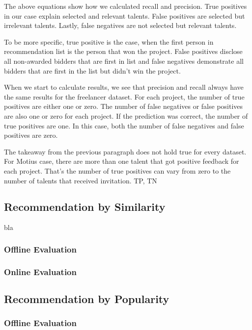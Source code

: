 The above equations show how we calculated recall and precision. True positives in our case explain selected and relevant talents. False positives are selected but irrelevant talents. Lastly, false negatives are not selected but relevant talents.

To be more specific, true positive is the case, when the first person in recommendation list is the person that won the project. False positives disclose all non-awarded bidders that are first in list and false negatives demonstrate all bidders that are first in the list but didn't win the project. 

When we start to calculate results, we see that precision and recall always have the same results for the freelancer dataset. For each project, the number of true positives are either one or zero. The number of false negatives or false positives are also one or zero for each project. If the prediction was correct, the number of true positives are one. In this case, both the number of false negatives and false positives are zero.

The takeaway from the previous paragraph does not hold true for every dataset. For Motius case, there are more than one talent that got positive feedback for each project. That's the number of true positives can vary from zero to the number of talents that received invitation. TP, TN


\subsection{Recommendation by Similarity}

bla

\subsubsection{Offline Evaluation}

\subsubsection{Online Evaluation}

\subsection{Recommendation by Popularity}\label{subsubsection:eval-popularity}

\subsubsection{Offline Evaluation}

